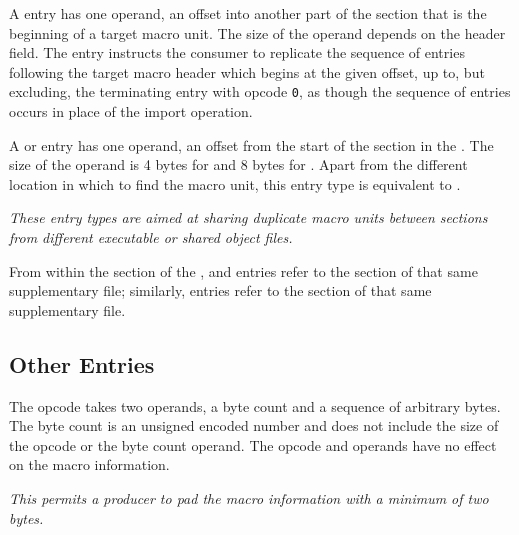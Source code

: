 \begin{enumerate}[1. ]
\itembfnl{\DWMACROimportTARG{}}
A \DWMACROimportNAME{} entry has one operand, an offset into
another part of the \dotdebugmacro{} section that is
the beginning of a target macro unit. The size of the operand
depends on the header \HFNoffsetsizeflag{} field.  The
\DWMACROimportNAME{} entry instructs the consumer to
replicate the sequence of entries following the target macro 
header which begins at the given 
\dotdebugmacro{} offset, up to, but excluding,
the terminating entry with opcode \texttt{0},
as though 
\bb
the sequence of entries
\eb
occurs in place of the import operation.

\itembfnl{\bb \DWMACROimportsupfourTARG, \DWMACROimportsupeightTARG}
A \DWMACROimportsupfourNAME{} or \DWMACROimportsupeightNAME{} 
\eb
entry has one operand, an 
offset from the start of the \dotdebugmacro{} section in the 
.  
The size of the operand 
\bb
is 4 bytes for \DWMACROimportsupfourNAME{} and 8 bytes for
\DWMACROimportsupeightNAME{}.
\eb
Apart from the different location in which to find the macro unit,
this entry type is equivalent to \DWMACROimport. 

\textit{
\bb
These entry types are
\eb
aimed at sharing duplicate 
macro units between \dotdebugmacro{}
sections from different executable or shared object files.}  

From within the \dotdebugmacro{} section of the 
, \DWMACROdefinestrp{} 
and \DWMACROundefstrp{} entries refer to the
\dotdebugstr{} section of that same supplementary file;
similarly, \DWMACROimport{} entries refer to the 
\dotdebugmacro{} section of that same supplementary file.

\end{enumerate}

\bb
\subsection{Other Entries}
\label{chap:otherentries}
\begin{enumerate}[1. ]
\itembfnl{\DWMACROpaddingTARG}
The \DWMACROpaddingNAME{} opcode takes two operands, a byte count 
and a sequence of arbitrary bytes. The byte count is an unsigned 
\ULEB{} encoded number and does not include the size of the opcode 
or the byte count operand. The opcode and operands have no effect 
on the macro information.

\textit{This permits a producer to pad the macro information 
with a minimum of two bytes.}
\end{enumerate}
\eb


